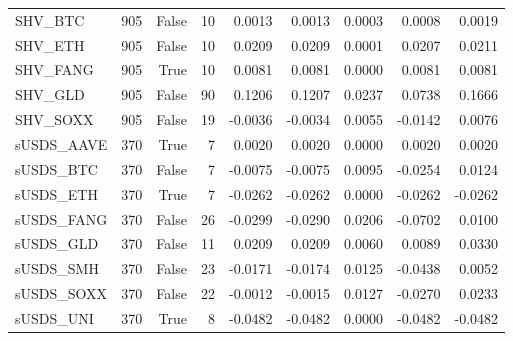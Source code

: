 \begin{tabular}{lrrrrrrrr}
SHV\_BTC & 905 & False & 10 & 0.0013 & 0.0013 & 0.0003 & 0.0008 & 0.0019 \\
SHV\_ETH & 905 & False & 10 & 0.0209 & 0.0209 & 0.0001 & 0.0207 & 0.0211 \\
SHV\_FANG & 905 & True & 10 & 0.0081 & 0.0081 & 0.0000 & 0.0081 & 0.0081 \\
SHV\_GLD & 905 & False & 90 & 0.1206 & 0.1207 & 0.0237 & 0.0738 & 0.1666 \\
SHV\_SOXX & 905 & False & 19 & -0.0036 & -0.0034 & 0.0055 & -0.0142 & 0.0076 \\
sUSDS\_AAVE & 370 & True & 7 & 0.0020 & 0.0020 & 0.0000 & 0.0020 & 0.0020 \\
sUSDS\_BTC & 370 & False & 7 & -0.0075 & -0.0075 & 0.0095 & -0.0254 & 0.0124 \\
sUSDS\_ETH & 370 & True & 7 & -0.0262 & -0.0262 & 0.0000 & -0.0262 & -0.0262 \\
sUSDS\_FANG & 370 & False & 26 & -0.0299 & -0.0290 & 0.0206 & -0.0702 & 0.0100 \\
sUSDS\_GLD & 370 & False & 11 & 0.0209 & 0.0209 & 0.0060 & 0.0089 & 0.0330 \\
sUSDS\_SMH & 370 & False & 23 & -0.0171 & -0.0174 & 0.0125 & -0.0438 & 0.0052 \\
sUSDS\_SOXX & 370 & False & 22 & -0.0012 & -0.0015 & 0.0127 & -0.0270 & 0.0233 \\
sUSDS\_UNI & 370 & True & 8 & -0.0482 & -0.0482 & 0.0000 & -0.0482 & -0.0482 \\
\bottomrule
\end{tabular}
